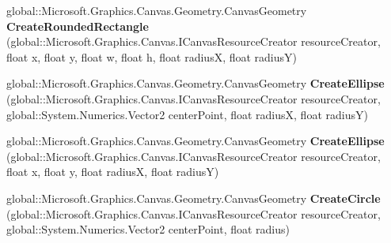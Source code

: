 \begin{DoxyCompactItemize}
\item 
\mbox{\label{interface_microsoft_1_1_graphics_1_1_canvas_1_1_geometry_1_1_i_canvas_geometry_statics_af546671007c12a6d9127c6fca9180c5b}} 
global\+::\+Microsoft.\+Graphics.\+Canvas.\+Geometry.\+Canvas\+Geometry {\bfseries Create\+Rounded\+Rectangle} (global\+::\+Microsoft.\+Graphics.\+Canvas.\+I\+Canvas\+Resource\+Creator resource\+Creator, float x, float y, float w, float h, float radiusX, float radiusY)
\item 
\mbox{\label{interface_microsoft_1_1_graphics_1_1_canvas_1_1_geometry_1_1_i_canvas_geometry_statics_ab568c0cde767f2a6103d7a1052f40358}} 
global\+::\+Microsoft.\+Graphics.\+Canvas.\+Geometry.\+Canvas\+Geometry {\bfseries Create\+Ellipse} (global\+::\+Microsoft.\+Graphics.\+Canvas.\+I\+Canvas\+Resource\+Creator resource\+Creator, global\+::\+System.\+Numerics.\+Vector2 center\+Point, float radiusX, float radiusY)
\item 
\mbox{\label{interface_microsoft_1_1_graphics_1_1_canvas_1_1_geometry_1_1_i_canvas_geometry_statics_addd384355b7e85eba839be661ab3dff0}} 
global\+::\+Microsoft.\+Graphics.\+Canvas.\+Geometry.\+Canvas\+Geometry {\bfseries Create\+Ellipse} (global\+::\+Microsoft.\+Graphics.\+Canvas.\+I\+Canvas\+Resource\+Creator resource\+Creator, float x, float y, float radiusX, float radiusY)
\item 
\mbox{\label{interface_microsoft_1_1_graphics_1_1_canvas_1_1_geometry_1_1_i_canvas_geometry_statics_ad8d580654397bcf2af6830928e681dc2}} 
global\+::\+Microsoft.\+Graphics.\+Canvas.\+Geometry.\+Canvas\+Geometry {\bfseries Create\+Circle} (global\+::\+Microsoft.\+Graphics.\+Canvas.\+I\+Canvas\+Resource\+Creator resource\+Creator, global\+::\+System.\+Numerics.\+Vector2 center\+Point, float radius)
\item 
\mbox{\label{interface_microsoft_1_1_graphics_1_1_canvas_1_1_geometry_1_1_i_canvas_geometry_statics_a451b4303daecd5545b17b3e57305e02f}} 

\end{DoxyCompactItemize}
